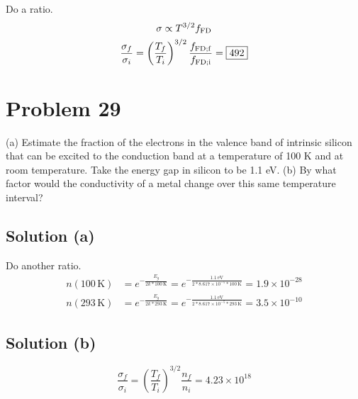 \documentclass[12pt]{article}
\newcommand{\e}[1]{e^{#1}}
\newcommand{\E}[1]{\times 10^{#1}}
\begin{document}
        Do a ratio.
        \begin{gather}
            \sigma \propto T^{3/2} f_{\rm FD}\\
            \frac{\sigma_{f}}{\sigma_{i}} = \left( \frac{T_f}{T_i} \right)^{3/2} \frac{f_{\rm FD;f}}{f_{\rm FD;i}}
                =   \boxed{492}
        \end{gather}
    \pagebreak

\section{Problem 29}
    (a) Estimate the fraction of the electrons in the valence band of intrinsic silicon that can be excited to the conduction band at a temperature of 100 K and at room temperature. 
    Take the energy gap in silicon to be 1.1 eV. 
    (b) By what factor would the conductivity of a metal change over this same temperature interval?

    \subsection{Solution (a)}
        Do another ratio.
        \begin{align}
            n(100\,\unit{\kelvin})  &=  \e{-\frac{E_g}{2k*100\,\unit{\kelvin}}}
                =   \e{-\frac{1.1\,\unit{\eV}}{2*8.617\E{-5}*100\,\unit{\kelvin}}}
                =   \boxed{1.9\E{-28}}\\
            n(293\,\unit{\kelvin})  &=  \e{-\frac{E_g}{2k*293\,\unit{\kelvin}}}
                =   \e{-\frac{1.1\,\unit{\eV}}{2*8.617\E{-5}*293\,\unit{\kelvin}}}
                =   \boxed{3.5\E{-10}}
        \end{align}

    \subsection{Solution (b)}
        \begin{equation}
            \frac{\sigma_{f}}{\sigma_{i}} = \left( \frac{T_f}{T_i} \right)^{3/2} \frac{n_f}{n_i}
                =   \boxed{4.23\E{18}}
        \end{equation}
\end{document}
